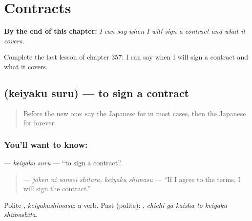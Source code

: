
\chapter{Contracts}
\label{ch:ja-contracts}

\begin{chapteropening}
\textbf{By the end of this chapter:} \emph{I can say when I will sign a contract and what it covers.}

Complete the last lesson of chapter 357: I can say when I will sign a contract and what it covers.
\end{chapteropening}

\section[\texorpdfstring{\ja{けいやくする} (keiyaku suru)}{けいやくする (keiyaku suru)}]{ (keiyaku suru) — to sign a contract}

\label{lesson:JA-C357-keiyaku-suru}



\begin{quote}
Before the new one: say the Japanese for in most cases, then the Japanese for forever.
\end{quote}

\subsection*{You'll want to know: }
\textbf{} — \emph{keiyaku suru} — \textquotedblleft{}to sign a contract\textquotedblright{}.

\begin{quote}
\textbf{ } — \emph{jōken ni sansei shitara, keiyaku shimasu} — \textquotedblleft{}If I agree to the terms, I will sign the contract.\textquotedblright{}
\end{quote}

Polite \textbf{}, \emph{keiyakushimasu}; a  verb. Past (polite): \textbf{  }, \emph{chichi ga kaisha to keiyaku shimashita}.

